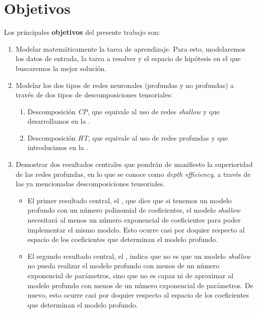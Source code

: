 \section{Objetivos}

Los principales \textbf{objetivos} del presente trabajo son:

\begin{enumerate}
	\item Modelar matemáticamente la tarea de aprendizaje. Para esto, modelaremos los datos de entrada, la tarea a resolver y el espacio de hipótesis en el que buscaremos la mejor solución.
	\item Modelar los dos tipos de redes neuronales (profundas y no profundas) a través de dos tipos de descomposiciones tensoriales:
	      \begin{enumerate}
		      \item Descomposición \textit{CP}, que equivale al uso de redes \textit{shallow}  y que desarrollamos en la .
		      \item Descomposición \textit{HT}, que equivale al uso de redes profundas y que introducimos en la .
	      \end{enumerate}
	\item Demostrar dos resultados centrales que pondrán de manifiesto la superioridad de las redes profundas, en lo que se conoce como \textit{depth efficiency}, a través de las ya mencionadas descomposiciones tensoriales.
	      \begin{itemize}
		      \item El primer resultado central, el , que dice que si tenemos un modelo profundo con un número polinomial de coeficientes, el modelo \textit{shallow} necesitará al menos un número exponencial de coeficientes para poder implementar el mismo modelo. Esto ocurre casi por doquier respecto al espacio de los coeficientes que determinan el modelo profundo.
		      \item El segundo resultado central, el , indica que no es que un modelo \textit{shallow} no pueda realizar el modelo profundo con menos de un número exponencial de parámetros, sino que no es capaz ni de aproximar al modelo profundo con menos de un número exponencial de parámetros. De nuevo, esto ocurre casi por doquier respecto al espacio de los coeficientes que determinan el modelo profundo.
	      \end{itemize}
\end{enumerate}


